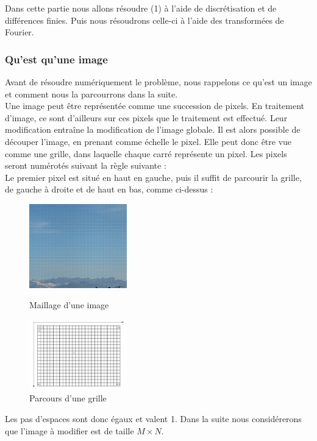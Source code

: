 Dans cette partie nous allons résoudre (1) à l'aide de discrétisation et de différences finies. Puis nous résoudrons celle-ci à l'aide des transformées de Fourier. \\
\subsubsection{Qu'est qu'une image}
Avant de résoudre numériquement le problème, nous rappelons ce qu'est un image et comment nous la  parcourrons dans la suite.\\
Une image peut être représentée comme une succession de pixels. En traitement d'image, ce sont d'ailleurs sur ces pixels que le traitement est effectué. Leur modification entraîne la modification de l'image globale. Il est alors possible de découper l'image, en prenant comme échelle le pixel. Elle peut donc être vue comme une grille, dans laquelle chaque carré représente un pixel. Les pixels seront numérotés suivant la règle suivante : \\

Le premier pixel est situé en haut en gauche, puis il suffit de parcourir la grille, de gauche à droite et de haut en bas, comme ci-dessus :  
\begin{figure}[!h]
   \begin{minipage}{0.5\textwidth}
     \centering
     \includegraphics[width = 120pt]{Images/Montagne_grille.jpg}
        \caption{Maillage d'une image}
      \end{minipage}\hfill
   \begin{minipage}{0.5\textwidth}
     \centering
     \includegraphics[width = 120pt]{Images/grille.png}
	\caption{Parcours d'une grille}
      \end{minipage}\hfill
\end{figure}

Les pas d'espaces sont donc égaux et valent 1. Dans la suite nous considérerons que l'image à modifier est de taille $M \times N$.

